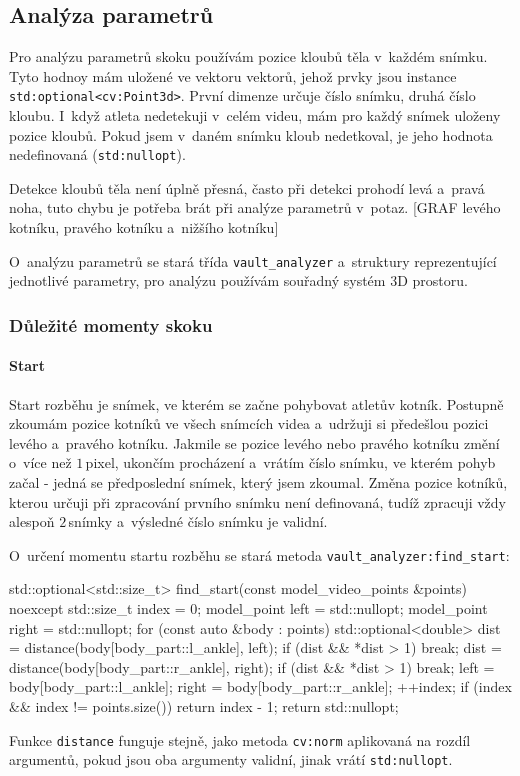 \subsection{Analýza parametrů}

Pro analýzu parametrů skoku používám pozice kloubů těla v~každém snímku. Tyto hodnoy mám uložené ve vektoru vektorů, jehož prvky jsou instance \texttt{std\::optional<cv\::Point3d>}. První dimenze určuje číslo snímku, druhá číslo kloubu. I~když atleta nedetekuji v~celém videu, mám pro každý snímek uloženy pozice kloubů. Pokud jsem v~daném snímku kloub nedetkoval, je jeho hodnota nedefinovaná (\texttt{std\::nullopt}).

Detekce kloubů těla není úplně přesná, často při detekci prohodí levá a~pravá noha, tuto chybu je potřeba brát při analýze parametrů v~potaz. [GRAF levého kotníku, pravého kotníku a~nižšího kotníku]

O~analýzu parametrů se stará třída \texttt{vault\_analyzer} a~struktury reprezentující jednotlivé parametry, pro analýzu používám souřadný systém 3D prostoru.


\subsubsection{Důležité momenty skoku}

\paragraph{Start}

Start rozběhu je snímek, ve kterém se začne pohybovat atletův kotník. Postupně zkoumám pozice kotníků ve všech snímcích videa a~udržuji si předešlou pozici levého a~pravého kotníku. Jakmile se pozice levého nebo pravého kotníku změní o~více než $1$\,\rm pixel, ukončím procházení a~vrátím číslo snímku, ve kterém pohyb začal - jedná se předposlední snímek, který jsem zkoumal. Změna pozice kotníků, kterou určuji při zpracování prvního snímku není definovaná, tudíž zpracuji vždy alespoň $2$\,\rm snímky a~výsledné číslo snímku je validní.

O~určení momentu startu rozběhu se stará metoda \texttt{vault\_analyzer\::find\_start}:
\begin{code}[fontsize=\footnotesize]
std::optional<std::size_t> find_start(const model_video_points &points)
noexcept {
    std::size_t index = 0;
    model_point left = std::nullopt;
    model_point right = std::nullopt;
    for (const auto &body : points) {
        std::optional<double> dist =
            distance(body[body_part::l_ankle], left);
        if (dist && *dist > 1) break;
        dist = distance(body[body_part::r_ankle], right);
        if (dist && *dist > 1) break;
        left = body[body_part::l_ankle];
        right = body[body_part::r_ankle];
        ++index;
    }
    if (index && index != points.size())
        return index - 1;
    return std::nullopt;
}
\end{code}
Funkce \texttt{distance} funguje stejně, jako metoda \texttt{cv\::norm} aplikovaná na rozdíl argumentů, pokud jsou oba argumenty validní, jinak vrátí \texttt{std\::nullopt}.

